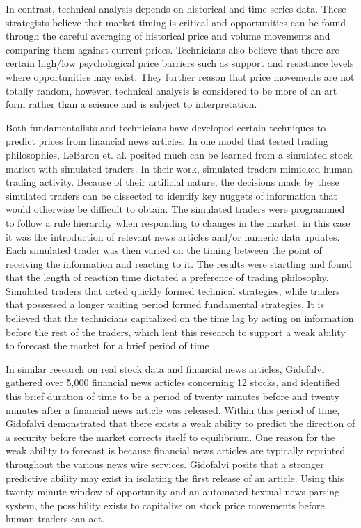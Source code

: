 In contrast, technical analysis depends on historical and time-series data. These strategists believe that market timing is critical and opportunities can be found through the careful averaging of historical price and volume movements and comparing them against current prices. Technicians also believe that there are certain high/low psychological price barriers such as support and resistance levels where opportunities may exist. They further reason that price movements are not totally random, however, technical analysis is considered to be more of an art form rather than a science and is subject to interpretation.

Both fundamentalists and technicians have developed certain techniques to predict prices from financial news articles. In one model that tested trading philosophies, \cite{tra} LeBaron et. al. posited much can be learned from a simulated stock market with simulated traders. In their work, simulated traders mimicked human trading activity. Because of their artificial nature, the decisions made by these simulated traders can be dissected to identify key nuggets of information that would otherwise be difficult to obtain. The simulated traders were programmed to follow a rule hierarchy when responding to changes in the market; in this case it was the introduction of relevant news articles and/or numeric data updates. Each simulated trader was then varied on the timing between the point of receiving the information and reacting to it. The results were startling and found that the length of reaction time dictated a preference of trading philosophy. Simulated traders that acted quickly formed technical strategies, while traders that possessed a longer waiting period formed fundamental strategies. It is believed that the technicians capitalized on the time lag by acting on information before the rest of the traders, which lent this research to support a weak ability to forecast the market for a brief period of time

In similar research on real stock data and financial news articles, \cite{gido} Gidofalvi gathered over 5,000 financial news articles concerning 12 stocks, and identified this brief duration of time to be a period of twenty minutes before and twenty minutes after a financial news article was released. Within this period of time, Gidofalvi demonstrated that there exists a weak ability to predict the direction of a security before the market corrects itself to equilibrium. One reason for the weak ability to forecast is because financial news articles are typically reprinted throughout the various news wire services. Gidofalvi posits that a stronger predictive ability may exist in isolating the first release of an article. Using this twenty-minute window of opportunity and an automated textual news parsing system, the possibility exists to capitalize on stock price movements before human traders can act. 

